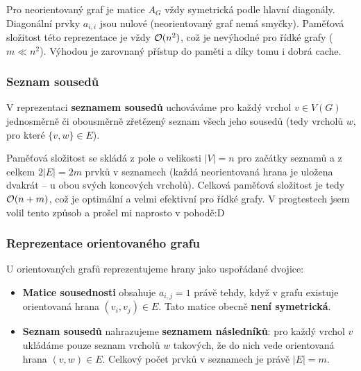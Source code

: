 \begin{remark}
Pro neorientovaný graf je matice $A_G$ vždy symetrická podle hlavní diagonály. Diagonální prvky $a_{i,i}$ jsou nulové (neorientovaný graf nemá smyčky). Paměťová složitost této reprezentace je vždy \textbf{$\mathcal{O}(n^2)$}, což je nevýhodné pro řídké grafy ($m \ll n^2$). Výhodou je zarovnaný přístup do paměti a díky tomu i dobrá cache.
\end{remark} \bigskip

\subsubsection{Seznam sousedů}
\begin{definition}
V reprezentaci \textbf{seznamem sousedů} uchováváme pro každý vrchol $v \in V(G)$ jednosměrně či obousměrně zřetězený seznam všech jeho sousedů (tedy vrcholů $w$, pro které $\{v, w\} \in E$).
\end{definition} \bigskip

\begin{remark}
Paměťová složitost se skládá z pole o velikosti $|V| = n$ pro začátky seznamů a z celkem $2|E| = 2m$ prvků v seznamech (každá neorientovaná hrana je uložena dvakrát -- u obou svých koncových vrcholů). Celková paměťová složitost je tedy \textbf{$\mathcal{O}(n + m)$}, což je optimální a velmi efektivní pro řídké grafy. V progtestech jsem volil tento způsob a prošel mi naprosto v pohodě:D
\end{remark} \bigskip

\subsubsection{Reprezentace orientovaného grafu}
U orientovaných grafů reprezentujeme hrany jako uspořádané dvojice:
\begin{itemize}
    \item \textbf{Matice sousednosti} obsahuje $a_{i,j} = 1$ právě tehdy, když v grafu existuje orientovaná hrana $(v_i, v_j) \in E$. Tato matice obecně \textbf{není symetrická}.
    \item \textbf{Seznam sousedů} nahrazujeme \textbf{seznamem následníků}: pro každý vrchol $v$ ukládáme pouze seznam vrcholů $w$ takových, že do nich vede orientovaná hrana $(v, w) \in E$. Celkový počet prvků v seznamech je právě $|E| = m$.
\end{itemize} \bigskip

\begin{center}
    
\end{center}

